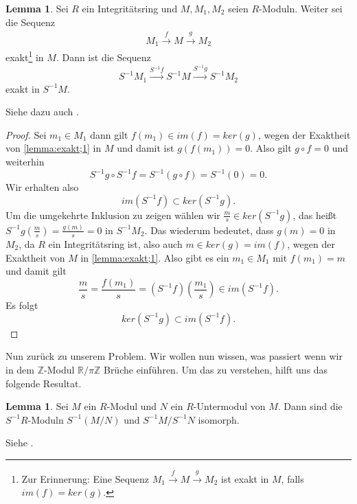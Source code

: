 \documentclass[11pt,titlepage]{article}
\newcommand{\setZ}{\mathbb{Z}}
\newcommand{\setR}{\mathbb{R}}
\theoremstyle{definition}
\newtheorem{lemma}[theorem]{Lemma}
\theoremstyle{remark}
\begin{document}
	\begin{lemma} \label{lemma:Buch;exakt}
		Sei $R$ ein Integritätsring und $M,M_1,M_2$ seien $R$-Moduln. Weiter 
		sei die Sequenz
		\begin{align}
			M_1\xrightarrow{f}M\xrightarrow{g}M_2 \label{lemma:exakt;1}
		\end{align}
		exakt\footnote{Zur Erinnerung: Eine Sequenz $M_1\xrightarrow{f}M\xrightarrow{g}M_2$ ist exakt in $M$, falls 
			$im(f)=ker(g)$.} in $M$. Dann ist die Sequenz
		\[S^{-1}M_1 \xrightarrow{S^{-1}f}S^{-1}M\xrightarrow{S^{-1}g}S^{-1}M_2\]
		exakt in $S^{-1}M$.
	\end{lemma}
	
	Siehe dazu auch \cite[Proposition 3.3]{introductiontocomalg}.
	
	\begin{proof}
		Sei $m_1\in M_1$ dann gilt $f(m_1)\in im(f)=ker(g)$, wegen der Exaktheit 
		von \ref{lemma:exakt;1} in $M$ und damit ist $g(f(m_1))=0$. Also gilt 
		$g\circ f=0$ und weiterhin
		\[S^{-1}g \circ S^{-1}f = S^{-1}(g\circ f)=S^{-1}(0)=0.\]
		Wir erhalten also
		\[im(S^{-1}f)\subset ker(S^{-1}g).\]
		Um die umgekehrte Inklusion zu zeigen wählen wir 
		$\frac{m}{s}\in ker(S^{-1}g)$, das heißt $S^{-1}g\left(\frac{m}{s}\right)=\frac{g(m)}{s}=0$ in $S^{-1}M_2$. 
		Das wiederum bedeutet, dass $g(m)=0$ in $M_2$, da $R$ ein Integritätsring 
		ist, also auch $m\in ker(g)=im(f)$, wegen der Exaktheit von $M$ in 
		\ref{lemma:exakt;1}. Also gibt es ein $m_1\in M_1$ mit $f(m_1)=m$ und damit 
		gilt
		\[\frac{m}{s}=\frac{f(m_1)}{s}=(S^{-1}f)\left(\frac{m_1}{s}\right)\in im(S^{-1}f).\]
		Es folgt 
		\[ker(S^{-1}g)\subset im(S^{-1}f).\]
	\end{proof}

	Nun zurück zu unserem Problem. Wir wollen nun wissen, was passiert wenn 
	wir in dem $\setZ$-Modul $\setR /\pi\setZ$ Brüche einführen. Um das 
	zu verstehen, hilft uns das folgende Resultat.
	
	\begin{lemma}
		Sei $M$ ein $R$-Modul und $N$ ein $R$-Untermodul von $M$. Dann sind die $S^{-1}R$-Moduln $S^{-1}(M/N)$ und 
		$S^{-1}M/S^{-1}N$ isomorph.
	\end{lemma}
	
	Siehe \cite[Korollar 3.4 (iii)]{introductiontocomalg}.
	
\end{document}
